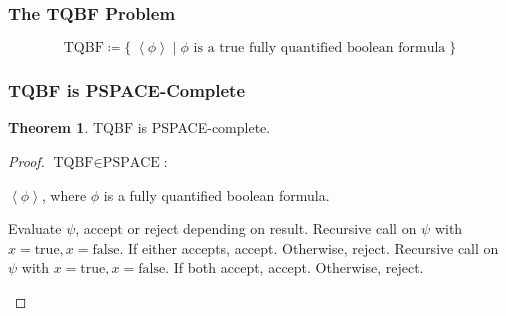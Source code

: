 \documentclass[notheorems]{beamer}
\theoremstyle{definition}
\newtheorem{theorem}{Theorem}
\theoremstyle{remark}
\newcommand{\pspaceclass}{\text{PSPACE}}
\newcommand{\tqbfprob}{\text{TQBF}}
\newcommand{\lpp}{\left \langle}
\newcommand{\rpp}{\right \rangle}
\newcommand{\enc}[1]{\lpp #1 \rpp}
\renewcommand{\qedsymbol}{\(\blacksquare\)}
\begin{document}
\begin{frame}
    \frametitle{The TQBF Problem}

    \begin{ceqn}
        \[
            \tqbfprob \coloneqq \{\; \enc{\phi} \mid \phi \text{ is a true fully quantified boolean formula}\;\}
        \]
    \end{ceqn}

\end{frame}

\begin{frame}
    \frametitle{TQBF is PSPACE-Complete}

    \begin{theorem}
        \(
            \tqbfprob
        \) is PSPACE-complete.
    \end{theorem}
    \begin{proof}
        \pause
        \(\tqbfprob \in \pspaceclass\):
        \begin{description}
            \scriptsize
            \item[Input:] \(\enc{\phi}\), where \(\phi\) is a fully quantified boolean formula.
            \item[Function:] \phantom{}
                \begin{algorithmic}[1]
                        \State Evaluate \(\psi\), accept or reject depending on result.
                        \State Recursive call on \(\psi\) with \(x=\text{true}, x=\text{false}\).
                        \State If either accepts, accept. Otherwise, reject.
                        \State Recursive call on \(\psi\) with \(x=\text{true}, x=\text{false}\).
                        \State If both accept, accept. Otherwise, reject.
                    \EndIf
                \end{algorithmic}
        \end{description}

        \renewcommand{\qedsymbol}{}
    \end{proof}

\end{frame}
\end{document}
